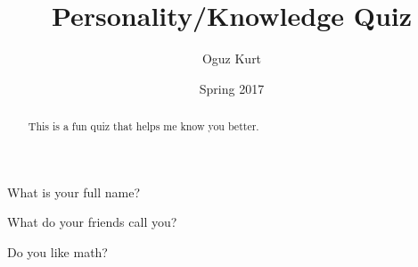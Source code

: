 \documentclass[handout]{ximera}
\title{Personality/Knowledge Quiz}
\author{Oguz Kurt}
\date{Spring 2017}
\begin{document}
\begin{abstract}
This is a fun quiz that helps me know you better.
\end{abstract} 
\maketitle

\begin{question}
What is your full name?
\begin{freeResponse}
\end{freeResponse}
\end{question}

\begin{question}
What do your friends call you?
\begin{freeResponse}
\end{freeResponse}
\end{question}

\begin{question}
Do you like math?
\begin{multipleChoice*}
\end{multipleChoice*}
\end{question}
\end{document}
